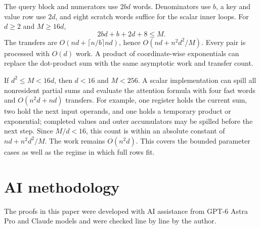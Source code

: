 \documentclass[11pt]{article}
\theoremstyle{definition}
\theoremstyle{remark}
\begin{document}
The query block and numerators use $2bd$ words. Denominators use $b$,
a key and value row use $2d$, and eight scratch words suffice for the
scalar inner loops. For $d\ge2$ and $M\ge16d$,
\[
 2bd+b+2d+8\le M.
\]
The transfers are $O(nd+\lceil n/b\rceil nd)$, hence
$O(nd+n^2d^2/M)$. Every pair is processed with $O(d)$ work.
A product of coordinate-wise exponentials can replace the dot-product
sum with the same asymptotic work and transfer count.

If $d^2\le M<16d$, then $d<16$ and $M<256$. A scalar implementation
can spill all nonresident partial sums and evaluate the attention
formula with four fast words and $O(n^2d+nd)$ transfers. For example,
one register holds the current sum, two hold the next input operands,
and one holds a temporary product or exponential; completed values
and outer accumulators may be spilled before the next step. Since
$M/d<16$, this count is within an absolute constant of
$nd+n^2d^2/M$. The work remains $O(n^2d)$. This covers the bounded
parameter cases as well as the regime in which full rows fit.

\section*{AI methodology}
{}
The proofs in this paper were developed with AI assistance from GPT-6
Astra Pro and Claude models and were checked line by line by the author.

\begingroup
{}


\endgroup
\end{document}
